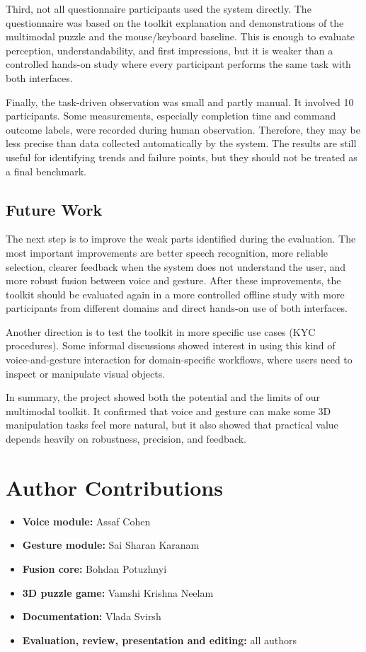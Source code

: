 \documentclass[sigconf]{acmart}
\begin{document}
Third, not all questionnaire participants used the system directly. The
questionnaire was based on the toolkit explanation and demonstrations of the
multimodal puzzle and the mouse/keyboard baseline. This is enough to evaluate
perception, understandability, and first impressions, but it is weaker than a
controlled hands-on study where every participant performs the same task with
both interfaces.

Finally, the task-driven observation was small and partly manual. It involved 10
participants. Some measurements, especially completion time and command outcome
labels, were recorded during human observation. Therefore, they may be less
precise than data collected automatically by the system. The results are still
useful for identifying trends and failure points, but they should not be treated
as a final benchmark.

\subsection{Future Work}
The next step is to improve the weak parts identified during the evaluation.
The most important improvements are better speech recognition, more reliable
selection, clearer feedback when the system does not understand the user, and
more robust fusion between voice and gesture. After these improvements, the
toolkit should be evaluated again in a more controlled offline study with more
participants from different domains and direct hands-on use of both interfaces.

Another direction is to test the toolkit in more specific use cases
(KYC procedures). Some informal discussions showed interest in using this kind
of voice-and-gesture interaction for domain-specific workflows, where users
need to inspect or manipulate visual objects.

In summary, the project showed both the potential and the limits of our
multimodal toolkit. It confirmed that voice and gesture can make some 3D
manipulation tasks feel more natural, but it also showed that practical value
depends heavily on robustness, precision, and feedback.

\section{Author Contributions}
\begin{itemize}[leftmargin=*]
  \item \textbf{Voice module:} Assaf Cohen
  \item \textbf{Gesture module:} Sai Sharan Karanam
  \item \textbf{Fusion core:} Bohdan Potuzhnyi
  \item \textbf{3D puzzle game:} Vamshi Krishna Neelam
  \item \textbf{Documentation:} Vlada Svirsh
  \item \textbf{Evaluation, review, presentation and editing:} all authors
\end{itemize}
\end{document}

